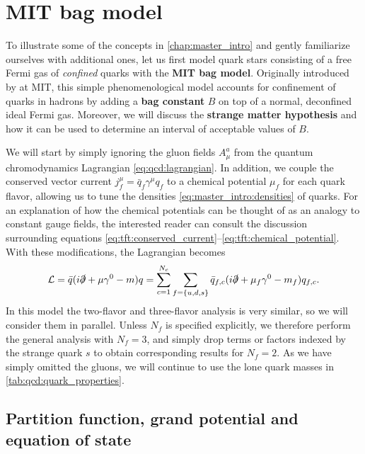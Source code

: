 \chapter{MIT bag model}

To illustrate some of the concepts in \cref{chap:master_intro} and gently familiarize ourselves with additional ones,
let us first model quark stars consisting of a free Fermi gas of \emph{confined} quarks with the \textbf{MIT bag model}.
Originally introduced by \cite{ref:mit_bag_model_original} at MIT, this simple phenomenological model accounts for confinement of quarks in hadrons by adding a \textbf{bag constant} $B$ on top of a normal, deconfined ideal Fermi gas.
Moreover, we will discuss the \textbf{strange matter hypothesis} and how it can be used to determine an interval of acceptable values of $B$.

We will start by simply ignoring the gluon fields $A_\mu^a$ from the quantum chromodynamics Lagrangian \eqref{eq:qcd:lagrangian}.
In addition, we couple the conserved vector current $j^\mu_f = \bar{q}_f \gamma^\mu q_f$ to a chemical potential $\mu_f$ for each quark flavor,
allowing us to tune the densities \eqref{eq:master_intro:densities} of quarks.
For an explanation of how the chemical potentials can be thought of as an analogy to constant gauge fields,
the interested reader can consult the discussion surrounding equations \eqref{eq:tft:conserved_current}--\eqref{eq:tft:chemical_potential}.
With these modifications, the Lagrangian becomes
\begin{equation}
	\mathcal{L} = \bar{q} (i \slashed\partial + \mu \gamma^0 - m) q
	      = \sum_{c=1}^{N_c} \sum_{f=\{u,d,s\}} \bar{q}_{f,c} (i \slashed\partial + \mu_f \gamma^0 - m_f) q_{f,c} .
\label{eq:mit:lagrangian}
\end{equation}
In this model the two-flavor and three-flavor analysis is very similar, so we will consider them in parallel.
Unless $N_f$ is specified explicitly, we therefore perform the general analysis with $N_f=3$,
and simply drop terms or factors indexed by the strange quark $s$ to obtain corresponding results for $N_f = 2$.
As we have simply omitted the gluons, we will continue to use the lone quark masses in \cref{tab:qcd:quark_properties}.

\section{Partition function, grand potential and equation of state}

